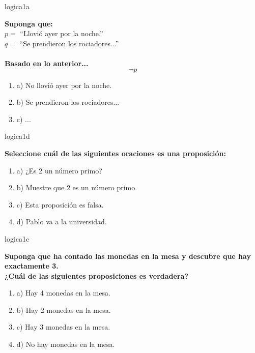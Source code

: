 \documentclass{article}
\begin{document}
\begin{question}{1}{logica}{1}{a}{
\textbf{Suponga que:}\\
\(p =\) “Llovió ayer por la noche.”\\
\(q =\) “Se prendieron los rociadores...”\\
\\[1mm]
\textbf{Basado en lo anterior...}\\
$$\neg p$$

\begin{enumerate}
    \item a) No llovió ayer por la noche.
    \item b) Se prendieron los rociadores...
    \item c) ...
\end{enumerate}
}
\end{question}

\begin{question}{2}{logica}{1}{d}{
\textbf{Seleccione cuál de las siguientes oraciones \textbf{es} una proposición:}\\
\begin{enumerate}
    \item a) ¿Es 2 un número primo?
    \item b) Muestre que 2 es un número primo.
    \item c) Esta proposición es falsa.
    \item d) Pablo va a la universidad.
\end{enumerate}
}
\end{question}

\begin{question}{3}{logica}{1}{c}{
\textbf{Suponga que ha contado las monedas en la mesa y descubre que hay exactamente 3.}\\
\textbf{¿Cuál de las siguientes proposiciones es \textbf{verdadera}?}\\

\begin{enumerate}
    \item a) Hay 4 monedas en la mesa.
    \item b) Hay 2 monedas en la mesa.
    \item c) Hay 3 monedas en la mesa.
    \item d) No hay monedas en la mesa.
\end{enumerate}
}
\end{question}
\end{document}
